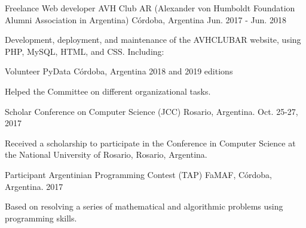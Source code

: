 \documentclass[10pt, a4paper]{resume}
\begin{document}
\begin{cventries}
  \cventry
    {Freelance Web developer}
    {AVH Club AR (Alexander von Humboldt Foundation Alumni Association in Argentina)}
    {Córdoba, Argentina}
    {Jun. 2017 - Jun. 2018}
    {
      \begin{cvitems}
        \item {Development, deployment, and maintenance of the AVHCLUBAR website, using PHP, MySQL, HTML, and CSS. Including: \newline
            }
      \end{cvitems}
    }

\end{cventries}



\begin{cventries}

  \cventry
    {Volunteer}
    {PyData}
    {Córdoba, Argentina}
    {2018 and 2019 editions}
    {
      \begin{cvitems}
		\item {Helped the Committee on different organizational tasks.}
      \end{cvitems}
    }

  \cventry
    {Scholar}
    {Conference on Computer Science (JCC)}
    {Rosario, Argentina.}
    {Oct. 25-27, 2017}
    {
      \begin{cvitems}
        \item {Received a scholarship to participate in the Conference in Computer Science at the National University of Rosario, Rosario, Argentina.}
      \end{cvitems}
    }

  \cventry
    {Participant}
    {Argentinian Programming Contest (TAP)}
    {FaMAF, Córdoba, Argentina.}
    {2017}
    {
      \begin{cvitems}
        \item {Based on resolving a series of mathematical and algorithmic problems using programming skills.}
      \end{cvitems}
    }

\end{cventries}
\end{document}
